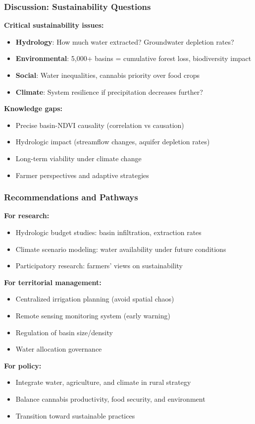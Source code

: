 \documentclass{beamer}
\begin{document}
\begin{frame}
\frametitle{Discussion: Sustainability Questions}
\textbf{Critical sustainability issues:}
\begin{itemize}
  \item \textbf{Hydrology}: How much water extracted? Groundwater depletion rates?
  \item \textbf{Environmental}: 5,000+ basins = cumulative forest loss, biodiversity impact
  \item \textbf{Social}: Water inequalities, cannabis priority over food crops
  \item \textbf{Climate}: System resilience if precipitation decreases further?
\end{itemize}

\textbf{Knowledge gaps:}
\begin{itemize}
  \item Precise basin-NDVI causality (correlation vs causation)
  \item Hydrologic impact (streamflow changes, aquifer depletion rates)
  \item Long-term viability under climate change
  \item Farmer perspectives and adaptive strategies
\end{itemize}
\end{frame}

\begin{frame}
\frametitle{Recommendations and Pathways}
\textbf{For research:}
\begin{itemize}
  \item Hydrologic budget studies: basin infiltration, extraction rates
  \item Climate scenario modeling: water availability under future conditions
  \item Participatory research: farmers' views on sustainability
\end{itemize}

\textbf{For territorial management:}
\begin{itemize}
  \item Centralized irrigation planning (avoid spatial chaos)
  \item Remote sensing monitoring system (early warning)
  \item Regulation of basin size/density
  \item Water allocation governance
\end{itemize}

\textbf{For policy:}
\begin{itemize}
  \item Integrate water, agriculture, and climate in rural strategy
  \item Balance cannabis productivity, food security, and environment
  \item Transition toward sustainable practices
\end{itemize}
\end{frame}
\end{document}
